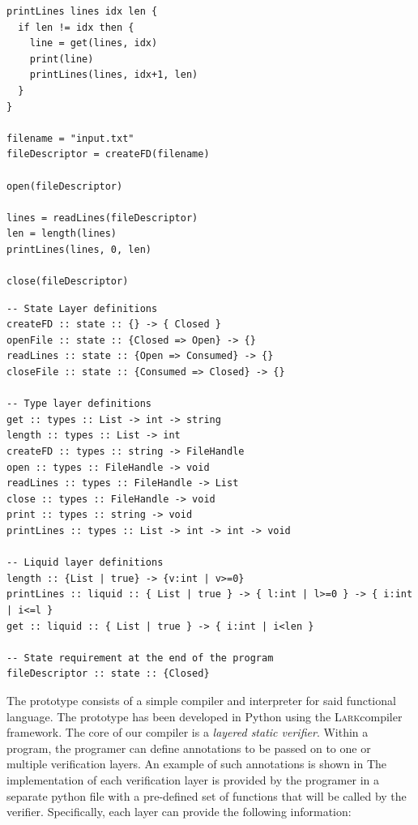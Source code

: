 \documentclass{easychair}
\newcommand{\LayeredTypes}{\textsc{LayeredTypes}}
\newcommand{\Lark}{\textsc{Lark}}
\begin{document}
\begin{minipage}{0.4\linewidth}
\begin{lstlisting}[caption={Simple example code},label={lst:code_before}]
printLines lines idx len {
  if len != idx then {
    line = get(lines, idx)
    print(line)
    printLines(lines, idx+1, len)
  }
}

filename = "input.txt"
fileDescriptor = createFD(filename)

open(fileDescriptor)

lines = readLines(fileDescriptor)
len = length(lines)
printLines(lines, 0, len)

close(fileDescriptor)
\end{lstlisting}
\end{minipage}%
\begin{minipage}{0.59\linewidth}
\begin{lstlisting}[caption={Annotations for \LayeredTypes},label={lst:code_after}]
-- State Layer definitions
createFD :: state :: {} -> { Closed }
openFile :: state :: {Closed => Open} -> {}
readLines :: state :: {Open => Consumed} -> {}
closeFile :: state :: {Consumed => Closed} -> {}

-- Type layer definitions
get :: types :: List -> int -> string
length :: types :: List -> int
createFD :: types :: string -> FileHandle
open :: types :: FileHandle -> void
readLines :: types :: FileHandle -> List
close :: types :: FileHandle -> void
print :: types :: string -> void
printLines :: types :: List -> int -> int -> void

-- Liquid layer definitions
length :: {List | true} -> {v:int | v>=0}
printLines :: liquid :: { List | true } -> { l:int | l>=0 } -> { i:int | i<=l }
get :: liquid :: { List | true } -> { i:int | i<len }

-- State requirement at the end of the program
fileDescriptor :: state :: {Closed}	
\end{lstlisting}
\end{minipage}

The prototype consists of a simple compiler and interpreter for said functional language. The prototype has been developed in Python using the \Lark compiler framework. The core of our compiler is a \textit{layered static verifier}. Within a program, the programer can define annotations to be passed on to one or multiple verification layers. An example of such annotations is shown in  The implementation of each verification layer is provided by the programer in a separate python file with a pre-defined set of functions that will be called by the verifier. Specifically, each layer can provide the following information:
\end{document}
